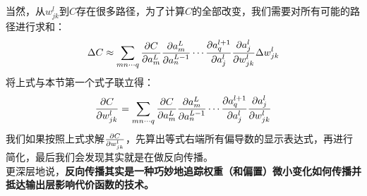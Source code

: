 \documentclass[a4paper, 11pt]{article}
\begin{document}
\begin{CJK*}{GBK}{song}
当然，从${w_{jk}^l}$到$C$存在很多路径，为了计算$C$的全部改变，我们需要对所有可能的路径进行求和：
$$\Delta C \approx \sum\limits_{mn \cdots q} {{{\partial C} \over {\partial a_m^L}}{{\partial a_m^L} \over {\partial a_n^{L - 1}}} \cdots {{\partial a_q^{l + 1}} \over {\partial a_j^l}}{{\partial a_j^l} \over {\partial w_{jk}^l}}\Delta w_{jk}^l} $$
将上式与本节第一个式子联立得：
$${{\partial C} \over {\partial w_{jk}^l}} = \sum\limits_{mn \cdots q} {{{\partial C} \over {\partial a_m^L}}{{\partial a_m^L} \over {\partial a_n^{L - 1}}} \cdots {{\partial a_q^{l + 1}} \over {\partial a_j^l}}{{\partial a_j^l} \over {\partial w_{jk}^l}}} $$
我们如果按照上式求解${{\partial C} \over {\partial w_{jk}^l}}$，先算出等式右端所有偏导数的显示表达式，再进行简化，最后我们会发现其实就是在做反向传播。
\\
\indent
更深层地说，{\bf 反向传播其实是一种巧妙地追踪权重（和偏置）微小变化如何传播并抵达输出层影响代价函数的技术。}
\end{CJK*}
\end{document}
